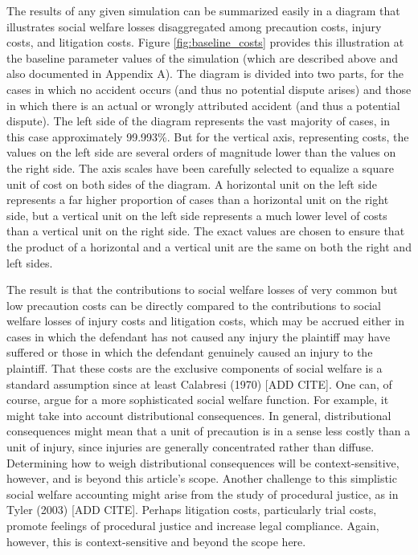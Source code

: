\documentclass{article}
\begin{document}
The results of any given simulation can be summarized easily in a diagram that illustrates social welfare losses disaggregated among precaution costs, injury costs, and litigation costs. Figure \ref{fig:baseline_costs} provides this illustration at the baseline parameter values of the simulation (which are described above and also documented in Appendix A). The diagram is divided into two parts, for the cases in which no accident occurs (and thus no potential dispute arises) and those in which there is an actual or wrongly attributed accident (and thus a potential dispute). The left side of the diagram represents the vast majority of cases, in this case approximately 99.993\%. But for the vertical axis, representing costs, the values on the left side are several orders of magnitude lower than the values on the right side. The axis scales have been carefully selected to equalize a square unit of cost on both sides of the diagram. A horizontal unit on the left side represents a far higher proportion of cases than a horizontal unit on the right side, but a vertical unit on the left side represents a much lower level of costs than a vertical unit on the right side. The exact values are chosen to ensure that the product of a horizontal and a vertical unit are the same on both the right and left sides. 

The result is that the contributions to social welfare losses of very common but low precaution costs can be directly compared to the contributions to social welfare losses of injury costs and litigation costs, which may be accrued either in cases in which the defendant has not caused any injury the plaintiff may have suffered or those in which the defendant genuinely caused an injury to the plaintiff. That these costs are the exclusive components of social welfare is a standard assumption since at least Calabresi (1970) [ADD CITE]. One can, of course, argue for a more sophisticated social welfare function. For example, it might take into account distributional consequences. In general, distributional consequences might mean that a unit of precaution is in a sense less costly than a unit of injury, since injuries are generally concentrated rather than diffuse. Determining how to weigh distributional consequences will be context-sensitive, however, and is beyond this article's scope. Another challenge to this simplistic social welfare accounting might arise from the study of procedural justice, as in Tyler (2003) [ADD CITE]. Perhaps litigation costs, particularly trial costs, promote feelings of procedural justice and increase legal compliance. Again, however, this is context-sensitive and beyond the scope here.
\end{document}
